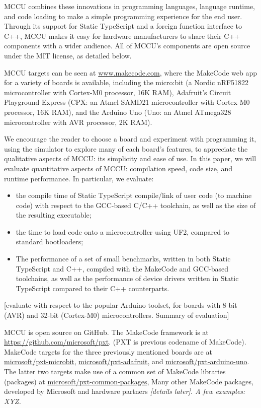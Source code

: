 MCCU combines these innovations in programming languages, language runtime, and code loading to make a simple 
programming experience for the end user.  Through its support for Static TypeScript and a foreign function 
interface to C++, MCCU makes it easy for hardware manufacturers to share their C++ components with a wider audience.  
All of MCCU's components are open source under the MIT license, as detailed below. 

MCCU targets can be seen at \url{www.makecode.com}, where the MakeCode web app for a variety of boards is available, 
including the micro:bit (a Nordic nRF51822 microcontroller with Cortex-M0 processor, 16K RAM), Adafruit's Circuit 
Playground Express (CPX: an Atmel SAMD21 microcontroller with Cortex-M0 processor, 16K RAM), and the Arduino Uno 
(Uno: an Atmel ATmega328 microcontroller with AVR processor, 2K RAM). 

We encourage the reader to choose a board and experiment with programming it, using the simulator to explore many of each board's features, 
to appreciate the qualitative aspects of MCCU: its simplicity and ease of use.  In this paper, we will evaluate quantitative aspects of MCCU: 
compilation speed, code size, and runtime performance.  In particular, we evaluate:
\begin{itemize}
\item the compile time of Static TypeScript compile/link of user code (to machine code) with respect 
      to the GCC-based C/C++ toolchain, as well as the size of the resulting executable;
\item the time to load code onto a microcontroller using UF2, compared to standard bootloaders; 
\item The performance of a set of small benchmarks, written in both Static TypeScript and C++,
      compiled with the MakeCode and GCC-based toolchains, as well as the performance of device drivers
      written in Static TypeScript compared to their C++ counterparts.
\end{itemize}
[evaluate with respect to the popular Arduino toolset, for boards with 8-bit (AVR) and 32-bit (Cortex-M0) microcontrollers. 
Summary of evaluation]

MCCU is open source on GitHub. The MakeCode framework is at \url{https://github.com/microsoft/pxt}.
(PXT is previous codename of MakeCode). 
MakeCode targets for the three previously mentioned boards are at 
\href{https://github.com/microsoft/pxt-microbit}{microsoft/pxt-microbit}, 
\href{https://github.com/microsoft/pxt-adafruit}{microsoft/pxt-adafruit}, and
\href{https://github.com/microsoft/pxt-arduino-uno}{microsoft/pxt-arduino-uno}.
The latter two targets make use of a common set of MakeCode libraries (packages) at
\href{https://github.com/microsoft/pxt-common-packages}{microsoft/pxt-common-packages},  
Many other MakeCode packages, developed by Microsoft and 
hardware partners \emph{ [details later]. A few examples: XYZ.  }

